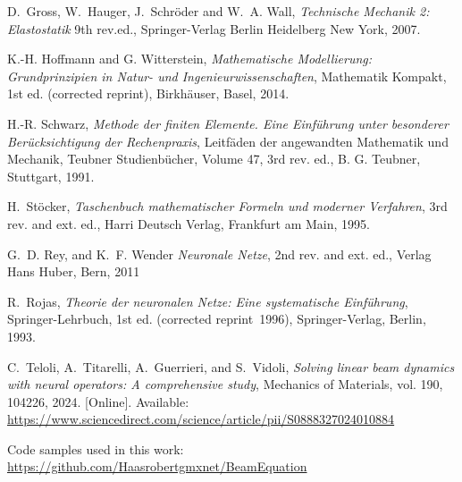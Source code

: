 \documentclass[a4paper,11pt]{article}
\begin{document}
\newpage
\begin{thebibliography}{9}


D.~Gross, W.~Hauger, J.~Schröder and W.~A. Wall,
\emph{Technische Mechanik 2: Elastostatik}
9th rev.ed., Springer-Verlag Berlin Heidelberg New York, 2007.

K.-H. Hoffmann and G. Witterstein, 
\emph{Mathematische Modellierung: Grundprinzipien in Natur- und Ingenieurwissenschaften}, 
Mathematik Kompakt, 1st ed. (corrected reprint), Birkhäuser, Basel, 2014.

H.-R. Schwarz,
\emph{Methode der finiten Elemente. Eine Einführung unter besonderer Berücksichtigung der Rechenpraxis},
Leitfäden der angewandten Mathematik und Mechanik, Teubner Studienbücher, Volume 47, 3rd rev. ed., B. G. Teubner, Stuttgart, 1991.

H.~Stöcker, 
\emph{Taschenbuch mathematischer Formeln und moderner Verfahren}, 
3rd rev. and ext. ed., Harri Deutsch Verlag, Frankfurt am Main, 1995.

G.~D. Rey, and K.~F. Wender
\emph{Neuronale Netze}, 
2nd rev. and ext. ed., Verlag Hans Huber, Bern, 2011

R.~Rojas,
\emph{Theorie der neuronalen Netze: Eine systematische Einführung},
Springer-Lehrbuch, 1st ed. (corrected reprint 1996), Springer-Verlag, Berlin, 1993.



C.~Teloli, A.~Titarelli, A.~Guerrieri, and S.~Vidoli, 
\emph{Solving linear beam dynamics with neural operators: A comprehensive study}, 
Mechanics of Materials, vol. 190, 104226, 2024. [Online]. Available: \url{https://www.sciencedirect.com/science/article/pii/S0888327024010884}

Code samples used in this work: \url{https://github.com/Haasrobertgmxnet/BeamEquation}

\end{thebibliography}


\newpage

\end{document}

